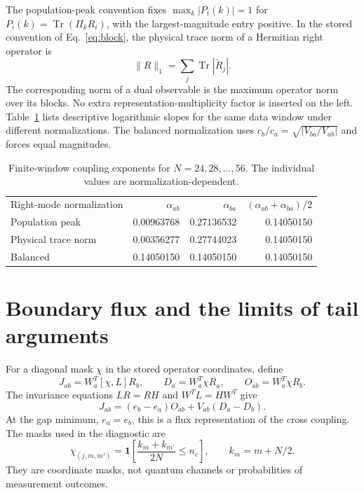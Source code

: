 \documentclass[aps,pra,10pt,onecolumn,superscriptaddress,amsmath,amssymb]{revtex4-2}
\newcommand{\Tr}{\operatorname{Tr}}
\begin{document}
The population-peak convention fixes $\max_k|P_i(k)|=1$ for $P_i(k)=\Tr(\Pi_kR_i)$, with the largest-magnitude entry positive. In the stored convention of Eq.~\eqref{eq:block}, the physical trace norm of a Hermitian right operator is
\begin{equation}
 \|R\|_1=\sum_j\Tr|\widetilde R_j|.
\end{equation}
The corresponding norm of a dual observable is the maximum operator norm over its blocks. No extra representation-multiplicity factor is inserted on the left. Table~\ref{tab:gauge} lists descriptive logarithmic slopes for the same data window under different normalizations. The balanced normalization uses $c_b/c_a=\sqrt{|V_{ba}/V_{ab}|}$ and forces equal magnitudes.

\begin{table}[h]
\caption{Finite-window coupling exponents for $N=24,28,\ldots,56$. The individual values are normalization-dependent.}
\label{tab:gauge}
\begin{ruledtabular}
\begin{tabular}{lrrr}
Right-mode normalization&$\alpha_{ab}$&$\alpha_{ba}$&$(\alpha_{ab}+\alpha_{ba})/2$\\
Population peak&0.00963768&0.27136532&0.14050150\\
Physical trace norm&0.00356277&0.27744023&0.14050150\\
Balanced&0.14050150&0.14050150&0.14050150
\end{tabular}
\end{ruledtabular}
\end{table}

\section{Boundary flux and the limits of tail arguments}
For a diagonal mask $\chi$ in the stored operator coordinates, define
\begin{equation}
 J_{ab}=W_a^T[\chi,L]R_b,\qquad
 D_a=W_a^T\chi R_a,\qquad O_{ab}=W_a^T\chi R_b.
\end{equation}
The invariance equations $LR=RH$ and $W^TL=HW^T$ give
\begin{equation}
 J_{ab}=(e_b-e_a)O_{ab}+V_{ab}(D_a-D_b).
\end{equation}
At the gap minimum, $e_a=e_b$, this is a flux representation of the cross coupling. The masks used in the diagnostic are
\begin{equation}
 \chi_{(j,m,m')}=\mathbf1\!\left[\frac{k_m+k_{m'}}{2N}\le n_c\right],
 \qquad k_m=m+N/2.
\end{equation}
They are coordinate masks, not quantum channels or probabilities of measurement outcomes.
\end{document}
